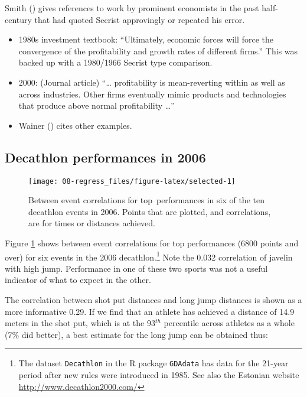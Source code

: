 \documentclass[
  10ptls,
  b5paper]{book}
\providecommand{\tightlist}{%
  \setlength{\itemsep}{0pt}\setlength{\parskip}{0pt}}
\begin{document}
Smith () gives references to work by prominent economists in the past half-century that had quoted Secrist approvingly or repeated his error.

\begin{itemize}
\tightlist
\item
  1980s investment textbook: ``Ultimately, economic forces will force the convergence of the profitability and growth rates of different firms.'' This was backed up with a 1980/1966 Secrist type comparison.
\item
  2000: (Journal article) ``\ldots{} profitability is mean-reverting within as well as across industries. Other firms eventually mimic products and technologies that produce above normal profitability \ldots{}''
\item
  Wainer () cites other examples.
\end{itemize}

\subsection*{Decathlon performances in 2006}\label{decathlon-performances-in-2006}

\begin{figure}[H]

{\centering \texttt{[image: 08-regress\_files/figure-latex/selected-1]} 

}

\caption{Between event correlations for top performances in six
of the ten decathlon events in 2006.  Points that are plotted,
and correlations, are for times or distances achieved.}\label{fig:selected}
\end{figure}

Figure \ref{fig:selected} shows between event correlations for top performances (6800 points and over) for six events in the 2006 decathlon.\footnote{The dataset \texttt{Decathlon} in the R package \texttt{GDAdata} has data for the 21-year period after new rules were introduced in 1985. See also the Estonian website \url{http://www.decathlon2000.com/}} Note the 0.032 correlation of javelin with high jump. Performance in one of these two sports was not a useful indicator of what to expect in the other.

The correlation between shot put distances and long jump distances is shown as a more informative 0.29. If we find that an athlete has achieved a distance of 14.9 meters in the shot put, which is at the 93\(^{th}\) percentile across athletes as a whole (7\% did better), a best estimate for the long jump can be obtained thus:
\end{document}
